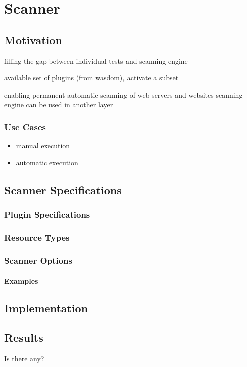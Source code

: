 \chapter{Scanner}
\label{chap4-scanner}
\thispagestyle{empty}

\section{Motivation}
filling the gap between individual tests and scanning engine

available set of plugins (from wasdom), activate a subset

enabling permanent automatic scanning of web servers and websites
scanning engine can be used in another layer
\subsection{Use Cases}
\begin{itemize}
\item manual execution
\item automatic execution
\end{itemize}

\section{Scanner Specifications}

\subsection{Plugin Specifications}
\subsection{Resource Types}
\subsection{Scanner Options}
\subsubsection{Examples}

\section{Implementation}
\section{Results}
Is there any?



